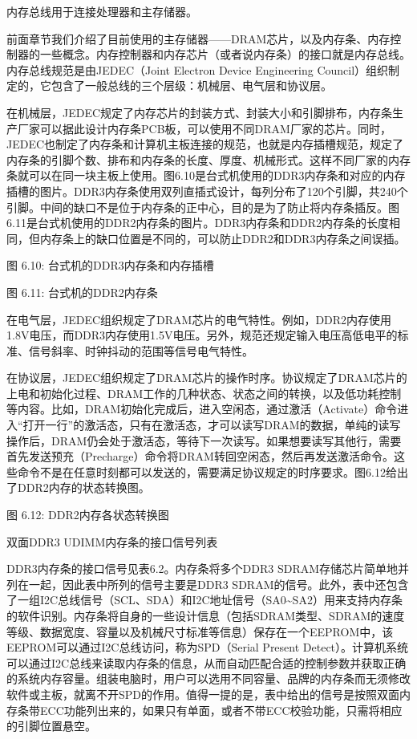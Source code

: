 \documentclass[]{ctexbook}
\begin{document}
内存总线用于连接处理器和主存储器。

前面章节我们介绍了目前使用的主存储器------DRAM芯片，以及内存条、内存控制器的一些概念。内存控制器和内存芯片（或者说内存条）的接口就是内存总线。内存总线规范是由JEDEC（Joint Electron Device Engineering Council）组织制定的，它包含了一般总线的三个层级：机械层、电气层和协议层。

在机械层，JEDEC规定了内存芯片的封装方式、封装大小和引脚排布，内存条生产厂家可以据此设计内存条PCB板，可以使用不同DRAM厂家的芯片。同时，JEDEC也制定了内存条和计算机主板连接的规范，也就是内存插槽规范，规定了内存条的引脚个数、排布和内存条的长度、厚度、机械形式。这样不同厂家的内存条就可以在同一块主板上使用。图6.10是台式机使用的DDR3内存条和对应的内存插槽的图片。DDR3内存条使用双列直插式设计，每列分布了120个引脚，共240个引脚。中间的缺口不是位于内存条的正中心，目的是为了防止将内存条插反。图6.11是台式机使用的DDR2内存条的图片。DDR3内存条和DDR2内存条的长度相同，但内存条上的缺口位置是不同的，可以防止DDR2和DDR3内存条之间误插。

图 6.10: 台式机的DDR3内存条和内存插槽

图 6.11: 台式机的DDR2内存条

在电气层，JEDEC组织规定了DRAM芯片的电气特性。例如，DDR2内存使用1.8V电压，而DDR3内存使用1.5V电压。另外，规范还规定输入电压高低电平的标准、信号斜率、时钟抖动的范围等信号电气特性。

在协议层，JEDEC组织规定了DRAM芯片的操作时序。协议规定了DRAM芯片的上电和初始化过程、DRAM工作的几种状态、状态之间的转换，以及低功耗控制等内容。比如，DRAM初始化完成后，进入空闲态，通过激活（Activate）命令进入``打开一行''的激活态，只有在激活态，才可以读写DRAM的数据，单纯的读写操作后，DRAM仍会处于激活态，等待下一次读写。如果想要读写其他行，需要首先发送预充（Precharge）命令将DRAM转回空闲态，然后再发送激活命令。这些命令不是在任意时刻都可以发送的，需要满足协议规定的时序要求。图6.12给出了DDR2内存的状态转换图。

图 6.12: DDR2内存各状态转换图

\label{tab:ddr3-udimm}双面DDR3 UDIMM内存条的接口信号列表

DDR3内存条的接口信号见表6.2。内存条将多个DDR3 SDRAM存储芯片简单地并列在一起，因此表中所列的信号主要是DDR3 SDRAM的信号。此外，表中还包含了一组I2C总线信号（SCL、SDA）和I2C地址信号（SA0\textasciitilde SA2）用来支持内存条的软件识别。内存条将自身的一些设计信息（包括SDRAM类型、SDRAM的速度等级、数据宽度、容量以及机械尺寸标准等信息）保存在一个EEPROM中，该EEPROM可以通过I2C总线访问，称为SPD（Serial Present Detect）。计算机系统可以通过I2C总线来读取内存条的信息，从而自动匹配合适的控制参数并获取正确的系统内存容量。组装电脑时，用户可以选用不同容量、品牌的内存条而无须修改软件或主板，就离不开SPD的作用。值得一提的是，表中给出的信号是按照双面内存条带ECC功能列出来的，如果只有单面，或者不带ECC校验功能，只需将相应的引脚位置悬空。
\end{document}
